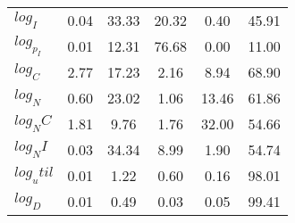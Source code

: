 \begin{center}
\begin{longtable}{lccccc}
$log_I     $	 & 	        0.04	 & 	       33.33	 & 	       20.32	 & 	        0.40	 & 	       45.91 \\ 
$log_p_I   $	 & 	        0.01	 & 	       12.31	 & 	       76.68	 & 	        0.00	 & 	       11.00 \\ 
$log_C     $	 & 	        2.77	 & 	       17.23	 & 	        2.16	 & 	        8.94	 & 	       68.90 \\ 
$log_N     $	 & 	        0.60	 & 	       23.02	 & 	        1.06	 & 	       13.46	 & 	       61.86 \\ 
$log_NC    $	 & 	        1.81	 & 	        9.76	 & 	        1.76	 & 	       32.00	 & 	       54.66 \\ 
$log_NI    $	 & 	        0.03	 & 	       34.34	 & 	        8.99	 & 	        1.90	 & 	       54.74 \\ 
$log_util  $	 & 	        0.01	 & 	        1.22	 & 	        0.60	 & 	        0.16	 & 	       98.01 \\ 
$log_D     $	 & 	        0.01	 & 	        0.49	 & 	        0.03	 & 	        0.05	 & 	       99.41 \\ 
\end{longtable}
 \end{center}
